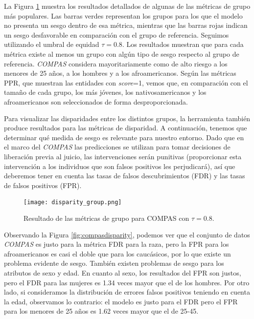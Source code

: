 La Figura \ref{fig:compasdgroup} muestra los resultados detallados de algunas de las métricas de grupo más populares. Las barras verdes representan los grupos para los que el modelo no presenta un sesgo dentro de esa métrica, mientras que las barras rojas indican un sesgo desfavorable en comparación con el grupo de referencia. Seguimos utilizando el umbral de equidad $\tau = 0.8$. Los resultados muestran que para cada métrica existe al menos un grupo con algún tipo de sesgo respecto al grupo de referencia. \textit{COMPAS} considera mayoritariamente como de alto riesgo a los menores de 25 años, a los hombres y a los afroamericanos. Según las métricas PPR, que muestran las entidades con \textit{score}=1, vemos que, en comparación con el tamaño de cada grupo, los más jóvenes, los nativosamericanos y los afroamericanos son seleccionados de forma desproporcionada.

Para visualizar las disparidades entre los distintos grupos, la herramienta
también produce resultados para las métricas de disparidad. A continuación, tenemos que determinar qué medida de sesgo es relevante para nuestro entorno. Dado que en el marco del \textit{COMPAS} las predicciones se utilizan para tomar decisiones de liberación previa al juicio, las intervenciones serán punitivas (proporcionar esta intervención a los individuos que son falsos positivos les perjudicará), así que deberemos tener en cuenta las tasas de falsos descubrimientos (FDR) y las tasas de falsos positivos (FPR).

\clearpage

\begin{figure}[h]
	\hspace{-2.5cm}
	\texttt{[image: disparity\_group.png]}
	\caption{Resultado de las métricas de grupo para COMPAS con $\tau=0.8$.}
    \label{fig:compasdgroup}
\end{figure}

Observando la Figura \ref{fig:compasdisparity}, podemos ver que el conjunto de datos \textit{COMPAS} es justo para la métrica FDR para la raza, pero la FPR para los afroamericanos es casi el doble que para los caucásicos, por lo que existe un problema evidente de sesgo. También existen problemas de sesgo para los atributos de sexo y edad. En cuanto al sexo, los resultados del FPR son justos, pero el FDR para las mujeres es 1.34 veces mayor que el de los hombres. Por otro lado, si consideramos la distribución de errores falsos positivos teniendo en cuenta la edad, observamos lo contrario: el modelo es justo para el FDR pero el FPR para los menores de 25 años es 1.62 veces mayor que el de 25-45.

